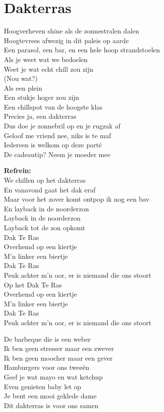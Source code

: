 \section{Dakterras}
Hoogverheven shine als de zonnestralen dalen\\
Hoogtevrees afwezig in dit paleis op aarde\\
Een parasol, een bar, en een hele hoop strandstoelen\\
Als je weet wat we bedoelen\\
Weet je wat echt chill zou zijn\\
(Nou wat?)\\
Als een plein\\
Een stukje hoger zou zijn\\
Een chillspot van de hoogste klas\\
Precies ja, een dakterras\\
Dus doe je zonnebril op en je rugzak af\\
Geloof me vriend nee, niks is te maf\\
Iedereen is welkom op deze parté\\
De cadeautip? Neem je moeder mee

\textbf{Refrein:}\\
We chillen op het dakterras\\
En vanavond gaat het dak eraf\\
Maar voor het zover komt ontpop ik nog een bav\\
En layback in de noorderzon\\
Layback in de noorderzon\\
Layback tot de zon opkomt\\
Dak Te Ras\\
Overhemd op een kiertje\\
M'n linker een biertje\\
Dak Te Ras\\
Peuk achter m'n oor, er is niemand die ons stoort\\
Op het Dak Te Ras\\
Overhemd op een kiertje\\
M'n linker een biertje\\
Dak Te Ras\\
Peuk achter m'n oor, er is niemand die ons stoort

De barbeque die is een weber\\
Ik ben geen stresser maar een zwever\\
Ik ben geen moocher maar een gever\\
Hamburgers voor ons tweeën\\
Geef je wat mayo en wat ketchup\\
Even genieten baby let op\\
Je bent een mooi geklede dame\\
Dit dakterras is voor ons samen

